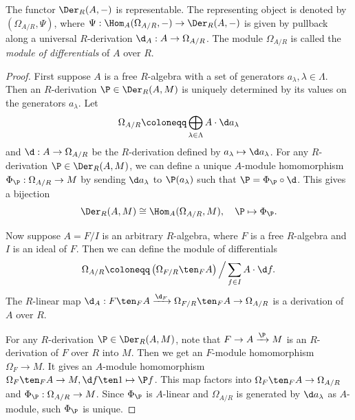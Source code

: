     \begin{proposition}\label{prop: module of differentials}
        The functor \(\Der_R(A, -)\) is representable.
        The representing object is denoted by \((\Omega_{A/R},\Psi)\), where \(\Psi:\Hom_A(\Omega_{A/R}, -) \to \Der_R(A, -)\) is given by pullback along a universal \(R\)-derivation \(\d_A: A \to \Omega_{A/R}\).
        The module \(\Omega_{A/R}\) is called the \emph{module of differentials} of \(A\) over \(R\).
    \end{proposition}
    \begin{proof}
        First suppose \(A\) is a free \(R\)-algebra with a set of generators \(a_\lambda, \lambda \in \Lambda\).
        Then an \(R\)-derivation \(\P \in \Der_R(A, M)\) is uniquely determined by its values on the generators \(a_\lambda\).
        Let 
        \[ \Omega_{A/R} \coloneqq \bigoplus_{\lambda \in \Lambda} A \cdot \d a_\lambda\]
        and \(\d: A \to \Omega_{A/R}\) be the \(R\)-derivation defined by \(a_\lambda \mapsto \d a_\lambda\).
        For any \(R\)-derivation \(\P \in \Der_R(A, M)\), we can define a unique \(A\)-module homomorphism
        \(\Phi_\P: \Omega_{A/R} \to M\) by sending \(\d a_\lambda\) to \(\P(a_\lambda)\) such that \(\P = \Phi_\P \circ \d\).
        This gives a bijection
        \[
            \Der_R(A, M) \cong \Hom_A(\Omega_{A/R}, M), \quad \P \mapsto \Phi_\P.
        \] 

        Now suppose \(A = F/I\) is an arbitrary \(R\)-algebra, where \(F\) is a free \(R\)-algebra and \(I\) is an ideal of \(F\).
        Then we can define the module of differentials 
        \[ \Omega_{A/R} \coloneqq \left(\Omega_{F/R} \ten_F A \right) \Big/ \sum_{f \in I} A \cdot \d f. \]
        The \(R\)-linear map \(\d_A: F\ten_F A \xrightarrow{\d_F} \Omega_{F/R} \ten_F A \to \Omega_{A/R}\) is a derivation of \(A\) over \(R\).
        
        For any \(R\)-derivation \(\P \in \Der_R(A, M)\), note that \(F \to A \xrightarrow{\P} M\) is an \(R\)-derivation of \(F\) over \(R\) into \(M\).
        Then we get an \(F\)-module homomorphism \(\Omega_F \to M\).
        It gives an \(A\)-module homomorphism \(\Omega_F \ten_F A \to M, \d f \ten 1 \mapsto \P f\).
        This map factors into \(\Omega_F \ten_F A \to \Omega_{A/R}\) and \(\Phi_\P: \Omega_{A/R} \to M\).
        Since \(\Phi_\P\) is \(A\)-linear and \(\Omega_{A/R}\) is generated by \(\d a_\lambda\) as \(A\)-module, such \(\Phi_\P\) is unique.
    \end{proof}

